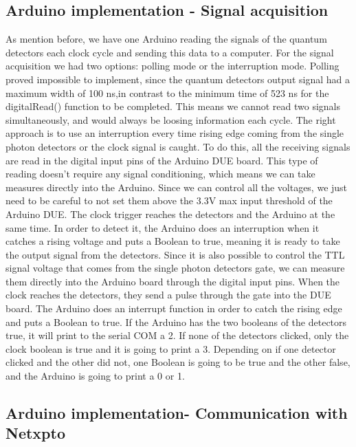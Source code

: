 \begin{refsection}
	\subsection{Arduino implementation - Signal acquisition}
	As mention before, we have one Arduino reading the signals of the quantum detectors each clock cycle and sending this data to a computer. For the signal acquisition we had two options: polling mode or the interruption mode. Polling proved impossible to implement, since the quantum detectors output signal had a maximum width of 100 ns,in contrast to the minimum time of 523 ns for the digitalRead() function to be completed. This means we cannot read two signals simultaneously, and would always be loosing information each cycle. The right approach is to use an interruption every time rising edge coming from the single photon detectors or the clock signal is caught. To do this, all the receiving signals are read in the digital input pins of the Arduino DUE board. This type of reading doesn't require any signal conditioning, which means we can take measures directly into the Arduino. Since we can control all the voltages, we just need to be careful to not set them above the 3.3V max input threshold of the Arduino DUE. The clock trigger reaches the detectors and the Arduino at the same time. In order to detect it, the Arduino does an interruption when it catches a rising voltage and puts a Boolean to true, meaning it is ready to take the output signal from the detectors.
	Since it is also possible to control the TTL signal voltage that comes from the single photon detectors gate, we can measure them directly into the Arduino board through the digital input pins. When the clock reaches the detectors, they send a pulse through the gate into the DUE board. The Arduino does an interrupt function in order to catch the rising edge and puts a Boolean to true. If the Arduino has the two booleans
	of the detectors true, it will print to the serial COM a 2. If none of the detectors clicked, only the clock boolean is true and it is going to print a 3. Depending on if one detector clicked and the other did not, one Boolean is going to be true and the other false, and the Arduino is going to print a 0 or 1.
		
	\subsection{Arduino implementation- Communication with Netxpto}
		

\end{refsection}
